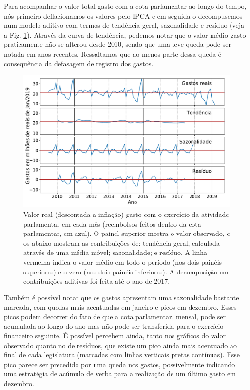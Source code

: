 \documentclass[12pt,a4paper]{article}
\begin{document}
Para acompanhar o valor total gasto com a cota parlamentar ao longo do tempo, nós primeiro deflacionamos os
valores pelo IPCA e em seguida o decompusemos num modelo aditivo com termos de tendência geral, sazonalidade e
resíduo (veja a Fig. \ref{fig:total-despesas-por-mes}). Através da curva de tendência, podemos notar que
o valor médio gasto praticamente não se alterou desde 2010, sendo que uma leve queda pode ser notada em anos
recentes. Ressaltamos que ao menos parte dessa queda é consequência da defasagem de registro dos gastos.

\begin{figure}[H]
\centering
\includegraphics[width=1.0\textwidth]{graficos/despesas-reais-e-sazonalidade_2019-04-29.pdf}
\caption{Valor real (descontada a inflação) gasto com o exercício da atividade parlamentar em cada mês
  (reembolsos feitos dentro da cota parlamentar, em azul). O painel superior mostra o valor observado, e os
  abaixo mostram as contribuições de: tendência geral, calculada através de uma média móvel; sazonalidade; e resíduo.
  A linha vermelha indica o valor médio em todo o período (nos dois painéis superiores) e o zero (nos dois
  painéis inferiores). A decomposição em contribuições aditivas foi feita até o ano de 2017.}
\label{fig:total-despesas-por-mes}
\end{figure} 

Também é possível notar que os gastos apresentam uma sazonalidade bastante marcada, com quedas mais
acentuadas em janeiro e picos em dezembro. Esses picos podem decorrer do fato de que a cota parlamentar, mensal,
pode ser acumulada ao longo do ano mas não pode ser transferida para o exercício financeiro seguinte.
É possível percebem ainda, tanto nos gráficos do valor observado quanto no de resíduos, que existe
um pico ainda mais acentuado ao final de cada legislatura (marcadas com linhas verticais pretas contínuas).
Esse pico parece ser precedido por uma queda nos gastos, possivelmente indicando uma estratégia de acúmulo de verba
para a realização de um último gasto em dezembro.
\end{document}
